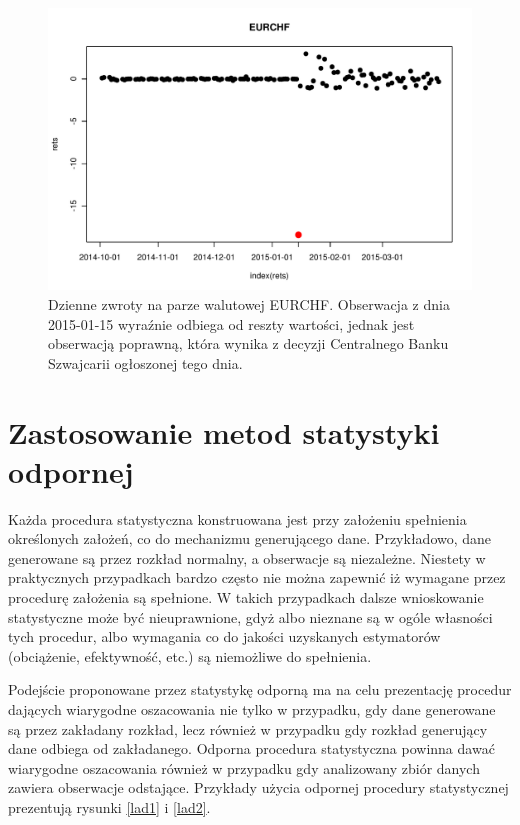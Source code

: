 \documentclass[a4paper,12pt,openany, DIV=calc, headsepline]{scrbook}
\begin{document}
\begin{figure}[H]
  \centering
  \includegraphics[scale=0.5]{wykresy/EURCHF}
  \caption{Dzienne zwroty na parze walutowej EURCHF. Obserwacja z dnia 2015-01-15 wyraźnie odbiega od reszty wartości, jednak jest obserwacją poprawną, która wynika z decyzji Centralnego Banku Szwajcarii ogłoszonej tego dnia.}
  \label{fig:eurchf}
\end{figure}


\section{Zastosowanie metod statystyki odpornej}

Każda procedura statystyczna konstruowana jest przy założeniu spełnienia określonych założeń, co do mechanizmu generującego dane. Przykładowo, dane generowane są przez rozkład normalny, a obserwacje są niezależne. Niestety w praktycznych przypadkach bardzo często nie można zapewnić iż wymagane przez procedurę założenia są spełnione. W takich przypadkach dalsze wnioskowanie statystyczne może być nieuprawnione, gdyż albo nieznane są w ogóle własności tych procedur, albo wymagania co do jakości uzyskanych estymatorów (obciążenie, efektywność, etc.) są niemożliwe do spełnienia.

Podejście proponowane przez statystykę odporną ma na celu prezentację procedur dających wiarygodne oszacowania nie tylko w przypadku, gdy dane generowane są przez zakładany rozkład, lecz również w przypadku gdy rozkład generujący dane odbiega od zakładanego. Odporna procedura statystyczna powinna dawać wiarygodne oszacowania również w przypadku gdy analizowany zbiór danych zawiera obserwacje odstające\citep{Van:2000}. Przykłady użycia odpornej procedury statystycznej prezentują rysunki \ref{lad1} i \ref{lad2}.
\end{document}
